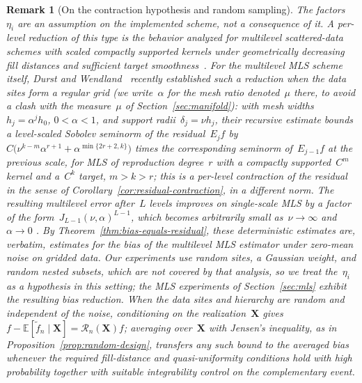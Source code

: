 \documentclass[12pt]{article}
\newtheorem{remark}{Remark}[section]
\newcommand{\E}{{\mathbb{E}}}
\begin{document}
\begin{remark}[On the contraction hypothesis and random sampling]\label{rem:contraction-hypothesis}
The factors~$\eta_i$ are an assumption on the implemented scheme, not a consequence of it. A per-level reduction of this type is the behavior analyzed for multilevel scattered-data schemes with scaled compactly supported kernels under geometrically decreasing fill distances and sufficient target smoothness~\cite{wendland2010multiscale,franz2023multilevel}. For the multilevel MLS scheme itself, Durst and Wendland~\cite{durst2026improved} recently established such a reduction when the data sites form a regular grid (we write~$\alpha$ for the mesh ratio denoted~$\mu$ there, to avoid a clash with the measure~$\mu$ of Section~\ref{sec:manifold}): with mesh widths~$h_j=\alpha^jh_0$, $0<\alpha<1$, and support radii~$\delta_j=\nu h_j$, their recursive estimate \cite[Theorem~3.2]{durst2026improved} bounds a level-scaled Sobolev seminorm of the residual~$E_jf$ by~$C\big(\nu^{k-m}\alpha^{r+1}+\alpha^{\min\{2r+2,k\}}\big)$ times the corresponding seminorm of~$E_{j-1}f$ at the previous scale, for MLS of reproduction degree~$r$ with a compactly supported~$C^m$ kernel and a~$C^k$ target, $m>k>r$; this is a per-level contraction of the residual in the sense of Corollary~\ref{cor:residual-contraction}, in a different norm. The resulting multilevel error after~$L$ levels improves on single-scale MLS by a factor of the form~$J_{L-1}(\nu,\alpha)^{L-1}$, which becomes arbitrarily small as~$\nu\to\infty$ and~$\alpha\to0$ \cite[Theorem~3.4]{durst2026improved}. By Theorem~\ref{thm:bias-equals-residual}, these deterministic estimates are, verbatim, estimates for the bias of the multilevel MLS estimator under zero-mean noise on gridded data. Our experiments use random sites, a Gaussian weight, and random nested subsets, which are not covered by that analysis, so we treat the~$\eta_i$ as a hypothesis in this setting; the MLS experiments of Section~\ref{sec:mls} exhibit the resulting bias reduction. When the data sites and hierarchy are random and independent of the noise, conditioning on the realization~$\mathbf X$ gives $f-\E[\widetilde f_n\mid\mathbf X]=\mathcal R_n(\mathbf X)f$; averaging over~$\mathbf X$ with Jensen's inequality, as in Proposition~\ref{prop:random-design}, transfers any such bound to the averaged bias whenever the required fill-distance and quasi-uniformity conditions hold with high probability together with suitable integrability control on the complementary event.
\end{remark}
\end{document}
